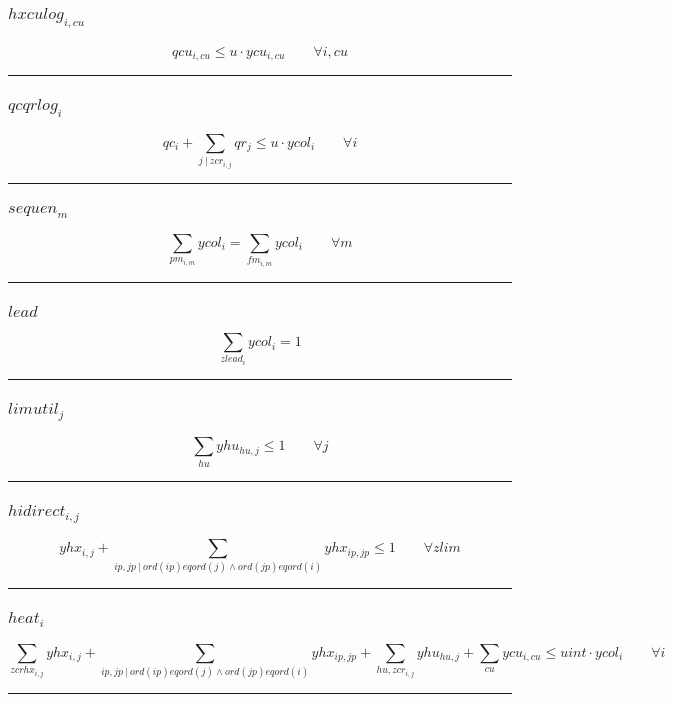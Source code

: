 \documentclass[11pt]{article}
\begin{document}
\subsubsection*{$hxculog_{i,cu}$}
\begin{equation*}
qcu_{i,cu} \leq u \cdot ycu_{i,cu}\qquad \forall i,cu
\end{equation*}
\vspace{5pt}
\hrule
\subsubsection*{$qcqrlog_{i}$}
\begin{equation*}
qc_{i} + \sum_{j ~ | ~ zcr_{i,j}} qr_{j} \leq u \cdot ycol_{i}\qquad \forall i
\end{equation*}
\vspace{5pt}
\hrule
\subsubsection*{$sequen_{m}$}
\begin{equation*}
\sum_{pm_{i,m}} ycol_{i} = \sum_{fm_{i,m}} ycol_{i}\qquad \forall m
\end{equation*}
\vspace{5pt}
\hrule
\subsubsection*{$lead$}
\begin{equation*}
\sum_{zlead_{i}} ycol_{i} = 1
\end{equation*}
\vspace{5pt}
\hrule
\subsubsection*{$limutil_{j}$}
\begin{equation*}
\sum_{hu} yhu_{hu,j} \leq 1\qquad \forall j
\end{equation*}
\vspace{5pt}
\hrule
\subsubsection*{$hidirect_{i,j}$}
\begin{equation*}
yhx_{i,j} + \sum_{ip,jp ~ | ~ ord(ip) eq ord(j) \wedge ord(jp) eq ord(i)} yhx_{ip,jp} \leq 1\qquad \forall zlim
\end{equation*}
\vspace{5pt}
\hrule
\subsubsection*{$heat_{i}$}
\begin{equation*}
\sum_{zcrhx_{i,j}} yhx_{i,j} + \sum_{ip,jp ~ | ~ ord(ip) eq ord(j) \wedge ord(jp) eq ord(i)} yhx_{ip,jp} + \sum_{hu,zcr_{i,j}} yhu_{hu,j} + \sum_{cu} ycu_{i,cu} \leq uint \cdot ycol_{i}\qquad \forall i
\end{equation*}
\vspace{5pt}
\hrule
\end{document}
